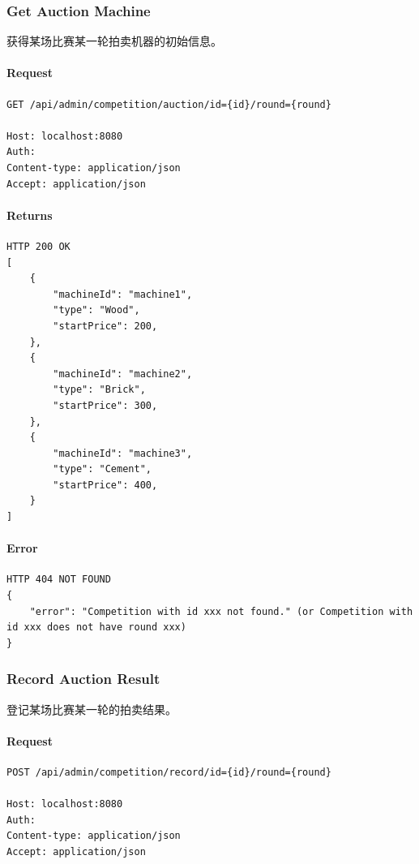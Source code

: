 \documentclass{article}
\begin{document}
\subsubsection{Get Auction Machine}

获得某场比赛某一轮拍卖机器的初始信息。

\paragraph*{Request}
\begin{lstlisting}
GET /api/admin/competition/auction/id={id}/round={round}

Host: localhost:8080
Auth:
Content-type: application/json
Accept: application/json
\end{lstlisting}

\paragraph*{Returns}
\begin{lstlisting}
HTTP 200 OK
[
    {
        "machineId": "machine1",
        "type": "Wood",
        "startPrice": 200,
    },
    {
        "machineId": "machine2",
        "type": "Brick",
        "startPrice": 300,
    },
    {
        "machineId": "machine3",
        "type": "Cement",
        "startPrice": 400,
    }
]
\end{lstlisting}

\paragraph*{Error}
\begin{lstlisting}
HTTP 404 NOT FOUND
{
    "error": "Competition with id xxx not found." (or Competition with id xxx does not have round xxx)
}
\end{lstlisting}

\subsubsection{Record Auction Result}

登记某场比赛某一轮的拍卖结果。

\paragraph*{Request}
\begin{lstlisting}
POST /api/admin/competition/record/id={id}/round={round}

Host: localhost:8080
Auth:
Content-type: application/json
Accept: application/json
\end{lstlisting}
\end{document}
